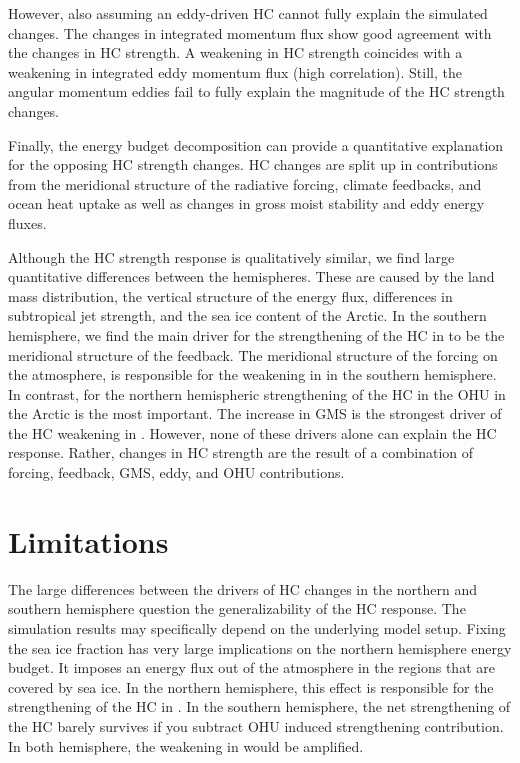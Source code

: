 However, also assuming an eddy-driven HC cannot fully explain the simulated changes. The changes in integrated momentum flux show good agreement with the changes in HC strength. A weakening in HC strength coincides with a weakening in integrated eddy momentum flux (high correlation). Still, the angular momentum eddies fail to fully explain the magnitude of the HC strength changes.

Finally, the energy budget decomposition can provide a quantitative explanation for the opposing HC strength changes. HC changes are split up in contributions from the meridional structure of the radiative forcing, climate feedbacks, and ocean heat uptake as well as changes in gross moist stability and eddy energy fluxes.

Although the HC strength response is qualitatively similar, we find large quantitative differences between the hemispheres. These are caused by the land mass distribution, the vertical structure of the energy flux, differences in subtropical jet strength, and the sea ice content of the Arctic. In the southern hemisphere, we find the main driver for the strengthening of the HC in \tropo to be the meridional structure of the feedback. The meridional structure of the forcing on the atmosphere, is responsible for the weakening in \strato in the southern hemisphere. In contrast, for the northern hemispheric strengthening of the HC in \tropo the OHU in the Arctic is the most important. The increase in GMS is the strongest driver of the HC weakening in \strato. However, none of these drivers alone can explain the HC response. Rather, changes in HC strength are the result of a combination of forcing, feedback, GMS, eddy, and OHU contributions.

\section{Limitations}

The large differences between the drivers of HC changes in the northern and southern hemisphere question the generalizability of the HC response. The simulation results may specifically depend on the underlying model setup. Fixing the sea ice fraction has very large implications on the northern hemisphere energy budget. It imposes an energy flux out of the atmosphere in the regions that are covered by sea ice. In the northern hemisphere, this effect is responsible for the strengthening of the HC in \tropo. In the southern hemisphere, the net strengthening of the HC barely survives if you subtract OHU induced strengthening contribution. In both hemisphere, the weakening in \uniform would be amplified.


